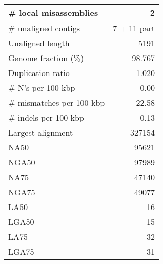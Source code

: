 \documentclass[12pt,a4paper]{article}
\begin{document}
\begin{table}[ht]
\begin{center}
\begin{tabular}{|l*{1}{|r}|}
\# local misassemblies & 2 \\ \hline
\# unaligned contigs & 7 + 11 part \\ \hline
Unaligned length & 5191 \\ \hline
Genome fraction (\%) & 98.767 \\ \hline
Duplication ratio & 1.020 \\ \hline
\# N's per 100 kbp & 0.00 \\ \hline
\# mismatches per 100 kbp & 22.58 \\ \hline
\# indels per 100 kbp & 0.13 \\ \hline
Largest alignment & 327154 \\ \hline
NA50 & 95621 \\ \hline
NGA50 & 97989 \\ \hline
NA75 & 47140 \\ \hline
NGA75 & 49077 \\ \hline
LA50 & 16 \\ \hline
LGA50 & 15 \\ \hline
LA75 & 32 \\ \hline
LGA75 & 31 \\ \hline
\end{tabular}
\end{center}
\end{table}
\end{document}
